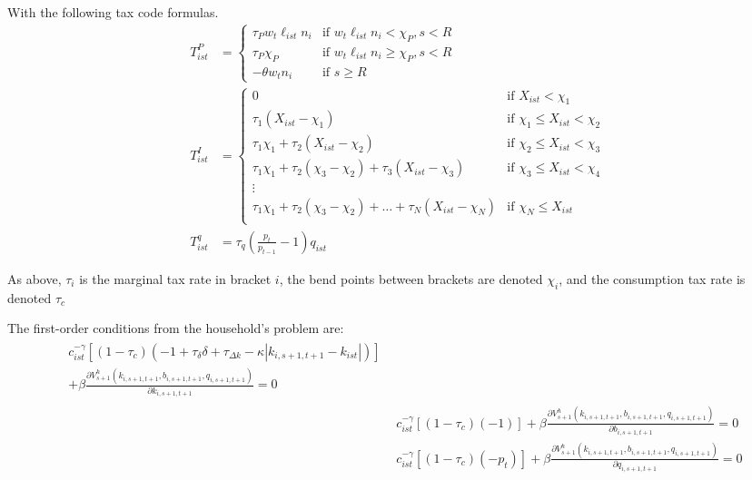 \documentclass[letterpaper,12pt]{article}
\theoremstyle{definition}
\numberwithin{equation}{section}
\begin{document}
\begin{spacing}{1.5}
      With the following tax code formulas.
      \begin{align}
      T^P_{ist} & = \left\{ \begin{matrix} \tau_P w_t \ell_{ist} n_i & \text{if } w_t \ell_{ist} n_i < \chi_P, s<R \\
                                         \tau_P \chi_P & \text{if } w_t \ell_{ist} n_i \ge \chi_P, s<R \\
                                         -\theta w_t n_i & \text{if } s\ge R
                                         \end{matrix} \right. \\
      T^I_{ist} & = \left\{ \begin{matrix} 0 & \text{if } X_{ist} < \chi_1 \\
                  \tau_1 (X_{ist} - \chi_1) & \text{if }  \chi_1 \le X_{ist} < \chi_2 \\
                  \tau_1 \chi_1 + \tau_2 (X_{ist} - \chi_2) & \text{if }  \chi_2 \le X_{ist} < \chi_3 \\
                  \tau_1 \chi_1 + \tau_2 (\chi_3 - \chi_2) + \tau_3 (X_{ist} - \chi_3) & \text{if }  \chi_3 \le X_{ist} < \chi_4 \\
                  \vdots \\
                  \tau_1 \chi_1 + \tau_2 (\chi_3 - \chi_2) +\dots+ \tau_N (X_{ist} - \chi_N) & \text{if }  \chi_N \le X_{ist} \\
                  \end{matrix} \right. \\
      T^q_{ist} & = \tau_q \left(\tfrac{p_t}{p_{t-1}}-1 \right) q_{ist}
      \end{align}

      As above, $\tau_i$ is the marginal tax rate in bracket $i$, the bend points between brackets are denoted $\chi_i$, and the consumption tax rate is denoted $\tau_c$

      The first-order conditions from the household's problem are:
      \begin{align}
      \begin{split}
      & c_{ist}^{-\gamma}\left[(1-\tau_c)\left(-1+\tau_\delta \delta + \tau_{\Delta k} - \kappa \left|k_{i,s+1,t+1} - k_{ist} \right|\right)\right] \\
      & + \beta \frac{\partial V^h_{s+1}(k_{i,s+1,t+1},b_{i,s+1,t+1},q_{i,s+1,t+1})}{\partial k_{i,s+1,t+1}} = 0 
      \end{split} \nonumber \\
      & c_{ist}^{-\gamma}[(1-\tau_c)(-1)] + \beta \frac{\partial V^h_{s+1}(k_{i,s+1,t+1},b_{i,s+1,t+1},q_{i,s+1,t+1})}{\partial b_{i,s+1,t+1}} = 0 \nonumber \\
      & c_{ist}^{-\gamma}[(1-\tau_c)(-p_t)] + \beta \frac{\partial V^h_{s+1}(k_{i,s+1,t+1},b_{i,s+1,t+1},q_{i,s+1,t+1})}{\partial q_{i,s+1,t+1}} = 0 \nonumber
      \end{align}


\end{spacing}
\end{document}
